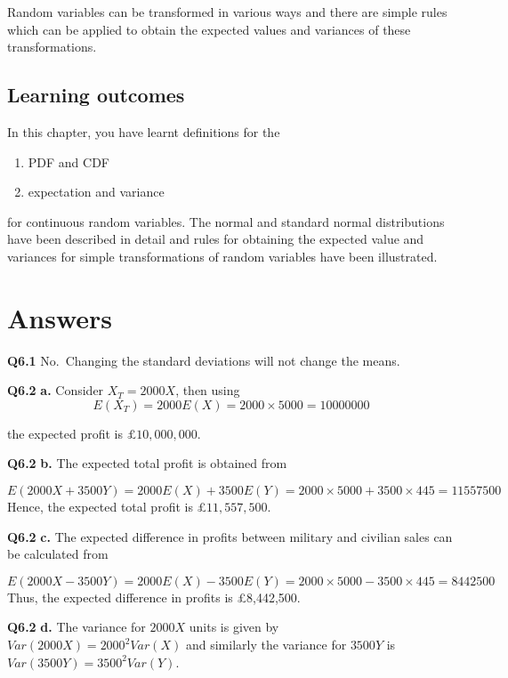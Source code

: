 \documentclass[
  oneside]{krantz}
\begin{document}
Random variables can be transformed in various ways and there are simple rules which can be applied to obtain the expected values and variances of these transformations.

\hypertarget{learning-outcomes-2}{%
\subsection{Learning outcomes}\label{learning-outcomes-2}}

In this chapter, you have learnt definitions for the

\begin{enumerate}
\def\labelenumi{\arabic{enumi}.}
\item
  PDF and CDF
\item
  expectation and variance
\end{enumerate}

for continuous random variables. The normal and standard normal distributions have been described in detail and rules for obtaining the expected value and variances for simple transformations of random variables have been illustrated.

\hypertarget{ANScontrv}{%
\section{Answers}\label{ANScontrv}}

\textbf{Q6.1} No.~Changing the standard deviations will not change the means.

\textbf{Q6.2} \textbf{a.} Consider \(X_T = 2000X\), then using
\[E(X_T) = 2000E(X) = 2000 \times 5000 = 10000000\]

the expected profit is \(\pounds 10,000,000\).

\textbf{Q6.2} \textbf{b.} The expected total profit is obtained from

\[ E(2000X+3500Y) = 2000E(X) + 3500E(Y) = 2000 \times 5000 + 3500 \times 445 = 11557500 \]
Hence, the expected total profit is £\(11,557,500\).

\textbf{Q6.2} \textbf{c.} The expected difference in profits between military and civilian sales can be calculated from

\[E(2000X - 3500Y) = 2000E(X) - 3500E(Y) = 2000 \times 5000 - 3500 \times 445 = 8442500\]
Thus, the expected difference in profits is £8,442,500.

\textbf{Q6.2} \textbf{d.} The variance for \(2000X\) units is given by \(Var(2000X) = 2000^2Var(X)\) and similarly the variance for \(3500Y\) is \(Var(3500Y) = 3500^2Var(Y)\).
\end{document}
